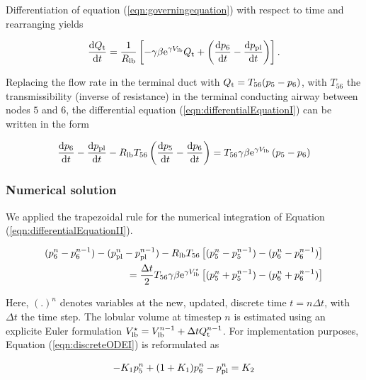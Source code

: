 Differentiation of equation (\ref{eqn:governingequation}) with respect to time and rearranging yields

\begin{equation} \label{eqn:differentialEquationI}
\frac{\mathrm{d} Q_{\mathrm{t}}}{\mathrm{d} t} = \frac{1}{R_{\mathrm{lb}}}\left[ -\gamma\beta\mathrm{e}^{\gamma V_{\mathrm{lb}}}Q_{\mathrm{t}} + \left(\frac{\mathrm{d} p_6}{\mathrm{d} t} - \frac{\mathrm{d} p_{\mathrm{pl}}}{\mathrm{d} t}\right)\right] \text{.}
\end{equation}

Replacing the flow rate in the terminal duct with $Q_{\mathrm{t}} = T_{56}(p_5 - p_6)$, with $T_{56}$ the transmissibility (inverse of resistance) in the terminal conducting airway between nodes $5$ and $6$, the differential equation (\ref{eqn:differentialEquationI}) can be written in the form

\begin{equation} \label{eqn:differentialEquationII}
  \frac{\mathrm{d} p_6}{\mathrm{d} t} - \frac{\mathrm{d} p_{\mathrm{pl}}}{\mathrm{d} t} - R_{\mathrm{lb}} T_{56}\left(\frac{\mathrm{d} p_5}{\mathrm{d} t} - \frac{\mathrm{d} p_6}{\mathrm{d} t}\right) = T_{56}\gamma\beta\mathrm{e}^{\gamma V_{\mathrm{lb}}}\left( p_5 - p_6\right)
\end{equation}


\subsubsection{Numerical solution}
We applied the trapezoidal rule for the numerical integration of Equation (\ref{eqn:differentialEquationII}).

\begin{equation}
\begin{split} \label{eqn:discreteODEI}
(p_6^n - p_6^{n-1}) - (p_{\mathrm{pl}}^n - p_{\mathrm{pl}}^{n-1}) - R_{\mathrm{lb}} T_{56} \left[ (p_5^n - p_5^{n-1}) - (p_6^n - p_6^{n-1})\right] \\
= \frac{\Delta t}{2}T_{56}\gamma\beta\mathrm{e}^{\gamma V_{\mathrm{lb}}^\star}\left[ (p_5^n + p_5^{n-1}) - (p_6^n + p_6^{n-1})\right]
\end{split}
\end{equation}

Here, $(.)^n$ denotes variables at the new, updated, discrete time $t = n\Delta t$, with $\Delta t$ the time step.
The lobular volume at timestep $n$ is estimated using an explicite Euler formulation $V_{\mathrm{lb}}^\star = V_{\mathrm{lb}}^{n-1} + \Delta t Q_{\mathrm{t}}^{n-1}$.
For implementation purposes, Equation (\ref{eqn:discreteODEI}) is reformulated as

\begin{equation} \label{eqn:discreteODEII}
  -K_1 p_5^n + (1 + K_1) p_6^n - p_{\mathrm{pl}}^n = K_2
\end{equation}

